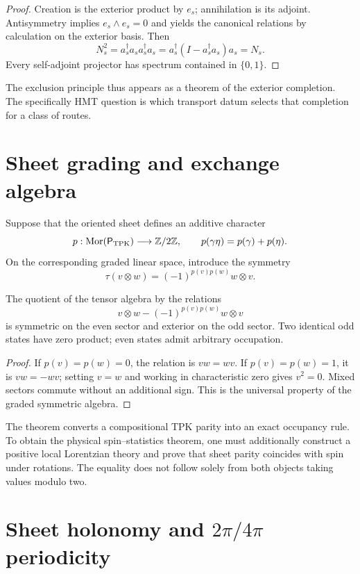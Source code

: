\begin{proof}
Creation is the exterior product by \(e_s\); annihilation is its
adjoint. Antisymmetry implies \(e_s\wedge e_s=0\) and yields the canonical
relations by calculation on the exterior basis. Then
\[
N_s^2=a_s^\dagger a_sa_s^\dagger a_s
=a_s^\dagger(I-a_s^\dagger a_s)a_s=N_s.
\]
Every self-adjoint projector has spectrum contained in \(\{0,1\}\).
\end{proof}

The exclusion principle thus appears as a theorem of the exterior
completion. The specifically HMT question is which transport datum selects
that completion for a class of routes.

\section{Sheet grading and exchange algebra}

Suppose that the oriented sheet defines an additive character
\[
 p:\operatorname{Mor}(\mathsf P_{\rm TPK})\longrightarrow\mathbb Z/2\mathbb Z,
 \qquad p(\gamma\eta)=p(\gamma)+p(\eta).
\]
On the corresponding graded linear space, introduce the symmetry
\[
 \tau(v\otimes w)=(-1)^{p(v)p(w)}w\otimes v.
\]

\begin{theorem}
The quotient of the tensor algebra by the relations
\[
 v\otimes w-(-1)^{p(v)p(w)}w\otimes v
\]
is symmetric on the even sector and exterior on the odd sector. Two identical
odd states have zero product; even states admit arbitrary
occupation.
\end{theorem}

\begin{proof}
If \(p(v)=p(w)=0\), the relation is \(vw=wv\). If
\(p(v)=p(w)=1\), it is \(vw=-wv\); setting \(v=w\) and working in
characteristic zero gives \(v^2=0\). Mixed sectors commute without
an additional sign. This is the universal property of the graded symmetric
algebra.
\end{proof}

The theorem converts a compositional TPK parity into an exact occupancy
rule. To obtain the physical spin--statistics theorem, one must additionally
construct a positive local Lorentzian theory and prove that sheet parity
coincides with spin under rotations. The equality does not follow solely
from both objects taking values modulo two.

\section{Sheet holonomy and \texorpdfstring{\(2\pi/4\pi\)}{2pi/4pi} periodicity}

